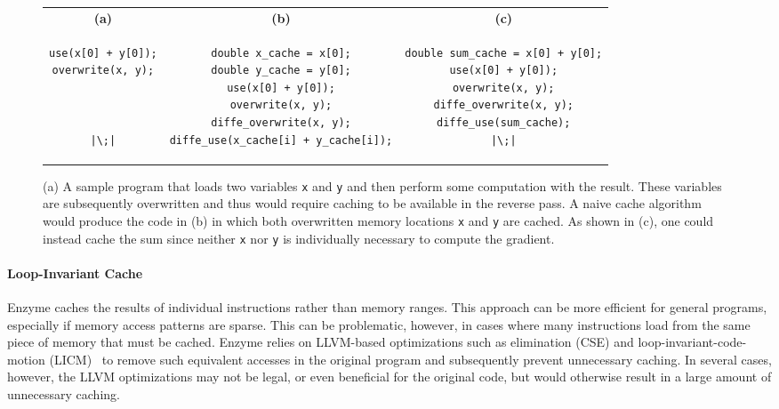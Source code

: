 \begin{figure*}
    \centering
 \begin{tabular}{c|c|c}
\textbf{(a)}&\textbf{(b)}&\textbf{(c)}\\
\begin{minipage}[T]{0.2\linewidth}
\begin{verbatim}
use(x[0] + y[0]);
overwrite(x, y);



|\;|
\end{verbatim}
\end{minipage}&\begin{minipage}[T]{0.33\linewidth}
\begin{verbatim}
double x_cache = x[0];
double y_cache = y[0];
use(x[0] + y[0]);
overwrite(x, y);
diffe_overwrite(x, y);
diffe_use(x_cache[i] + y_cache[i]);
\end{verbatim}
\end{minipage}& \begin{minipage}[T]{0.37\linewidth}
\begin{verbatim}
double sum_cache = x[0] + y[0];
use(x[0] + y[0]);
overwrite(x, y);
diffe_overwrite(x, y);
diffe_use(sum_cache);
|\;|
\end{verbatim}
\end{minipage}
\end{tabular}
    \caption{(a) A sample program that loads two variables \texttt{x} and \texttt{y} and then perform some computation with the result. These variables are subsequently overwritten and thus would require caching to be available in the reverse pass. A naive cache algorithm would produce the code in (b) in which both overwritten memory locations \texttt{x} and \texttt{y} are cached. As shown in (c), one could instead cache the sum since neither \texttt{x} nor \texttt{y} is individually necessary to compute the gradient.}
    \label{fig:new_cache}
\end{figure*}

\paragraph{\textbf{Loop-Invariant Cache}}
Enzyme caches the results of individual instructions rather than memory ranges. This approach can be more efficient for general programs, especially if memory access patterns are sparse. This can be problematic, however, in cases where many instructions load from the same piece of memory that must be cached. Enzyme relies on LLVM-based optimizations such as  elimination (CSE) and loop-invariant-code-motion (LICM)~\cite[Sec.~13.2]{Muchnick97} to remove such equivalent accesses in the original program and subsequently prevent unnecessary caching.  In several cases, however, the LLVM optimizations may not be legal, or even beneficial for the original code, but would otherwise result in a large amount of unnecessary caching.


